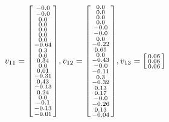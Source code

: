 \documentclass[a4paper,hidelinks,14pt]{extarticle}
\begin{document}
	$$
	v_{11}=\begin{bsmallmatrix}
		-0.0\\ 
		-0.0\\ 
		0.0\\  
		0.0\\  
		0.0\\  
		0.0\\  
		0.0\\  
		-0.64\\
		0.3\\  
		0.0\\  
		0.34\\ 
		0.0\\  
		0.01\\ 
		-0.31\\
		0.43\\ 
		-0.13\\
		0.24\\ 
		0.0\\  
		-0.1\\ 
		-0.13\\
		-0.01\\
	\end{bsmallmatrix},
	v_{12}=\begin{bsmallmatrix}
		  0.0\\   
		0.0\\   
		0.0\\    
		0.0\\    
		-0.0\\   
		-0.0\\   
		0.0\\    
		-0.22\\
		0.65\\   
		0.0\\    
		-0.43\\ 
		-0.0\\   
		-0.11\\ 
		0.3\\  
		-0.32\\ 
		0.13\\ 
		0.17\\  
		-0.0\\   
		-0.26\\ 
		0.13\\ 
		-0.04\\
	\end{bsmallmatrix},
	v_{13}=\begin{bsmallmatrix}
		  0.06\\     
		0.06\\     
		0.06\\      

\end{bsmallmatrix}$$
\end{document}
